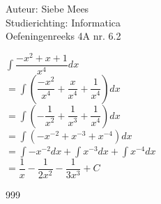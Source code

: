 \documentclass[a4paper]{article}
\begin{document}
  
\noindent \large Auteur: Siebe Mees \\
\noindent \large Studierichting: Informatica\\
\noindent \large Oefeningenreeks 4A nr. 6.2\\

\medskip

\normalsize

$\displaystyle\int \dfrac{-x^2+x+1}{x^4} dx$\\

$ = \displaystyle\int \left( \dfrac{-x^2}{x^4} + \dfrac{x}{x^4} + \dfrac{1}{x^4} \right) dx$\\

$ = \displaystyle\int \left( -\dfrac{1}{x^2} + \dfrac{1}{x^3} + \dfrac{1}{x^4} \right) dx$\\

$ = \displaystyle\int \left( -x^{-2}+x^{-3}+x^{-4} \right) dx $\\

$ = \displaystyle\int -x^{-2}dx + \displaystyle\int x^{-3}dx + \displaystyle\int x^{-4} dx $\\

$ = \dfrac{1}{x} - \dfrac{1}{2x^2} - \dfrac{1}{3x^3} + C $\\

\begin{thebibliography}{999}
\end{thebibliography}
\end{document}
